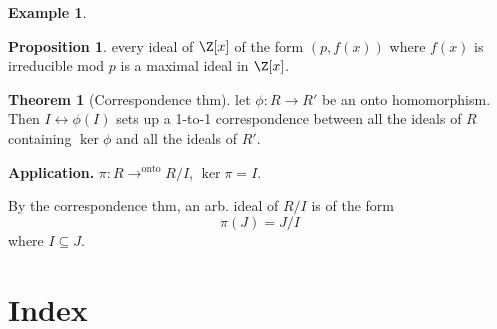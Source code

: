 \documentclass[a5paper]{article}
\theoremstyle{definition}%
\newtheorem*{theorem*}{Theorem} %
\newtheorem*{proposition*}{Proposition}
\newtheorem*{example*}{Example}
\numberwithin{exercise}{section}
\theoremstyle{remark}%
\begin{document}
\begin{example*}\mbox{}
\end{example*}

\begin{highlight}
\begin{proposition*}
every ideal of $\Z[x]$ of the form $(p,f(x))$ where $f(x)$ is irreducible mod $p$ is a maximal ideal in $\Z[x]$. 
\end{proposition*}
\end{highlight}

\begin{highlight}
\begin{theorem*}[Correspondence thm]
let $\phi:R\to R'$ be an onto homomorphism. Then $I\leftrightarrow \phi(I)$ sets up a 1-to-1 correspondence between all the ideals of $R$ containing $\ker\phi$ and all the ideals of $R'$. 
\end{theorem*}
\end{highlight}

\pagebreak
\noindent \textbf{Application.} $\pi:R\to^\text{onto} R/I$, $\ker\pi=I$. 

\noindent By the correspondence thm, an arb. ideal of $R/I$ is of the form 
$$\pi(J) = J/I$$ where $I\subseteq J$. 


\pagebreak
\section{Index}
\printindex
\end{document}
